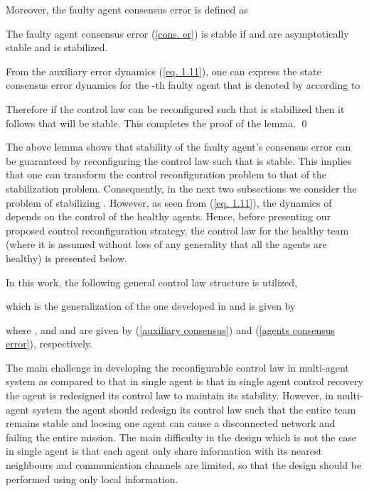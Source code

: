 \documentclass[12pt,draftcls,onecolumn]{IEEEtran}
\begin{document}
Moreover, the faulty agent consensus error is defined as 

\begin{lemmas}\label{Lemma 1}
The faulty agent consensus error (\ref{cons. er}) is stable 
if  and  are asymptotically stable and  is stabilized.
\end{lemmas}
\proof
From the auxiliary error dynamics  (\ref{eq. 1.11}), one can express the state consensus error dynamics for the -th faulty agent that is denoted by  according to

Therefore if the control law  can be reconfigured such that  is stabilized then it follows that  will be stable. This completes the proof of the lemma.   \qed
\par
The above lemma shows that stability of the faulty agent's consensus error can be guaranteed by  reconfiguring the control law  such that   is stable. This implies that  one can transform the control reconfiguration problem to that of the stabilization problem. Consequently, in the next two subsections we consider the problem of stabilizing . However, as  seen from (\ref{eq. 1.11}), the dynamics of  depends on the control of the healthy agents. Hence, before presenting our proposed control reconfiguration strategy, the control law for   the healthy team (where it is assumed without loss of any generality that all the agents are healthy) is presented below.
 \par
In this work, the following general  control law structure is utilized,

which is the generalization of the one  developed in \cite{Li13} and is given by 

where , and   and  are given by (\ref{auxiliary consensus}) and (\ref{agents consensus error}), respectively.

\begin{remarks}
The main challenge in developing the reconfigurable control law in multi-agent system as compared to that in single agent is that  in single agent control recovery the agent is redesigned its control law to maintain its stability. However, in multi-agent system the agent should redesign its control law such that the entire team remains stable and loosing one agent can cause a disconnected network and failing the entire mission. The main difficulty  in the design which is not the case in single agent is that   each agent only share information with its nearest neighbours and communication channels are limited, so that the design should be performed using only local information.  
\end{remarks}
\end{document}
